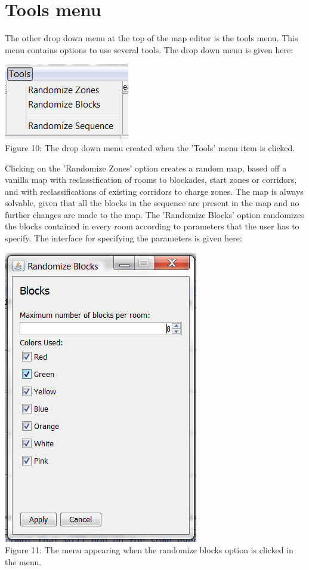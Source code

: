 \documentclass[]{article}
\begin{document}
\section*{Tools menu}
The other drop down menu at the top of the map editor is the tools menu. This menu contains options to use several tools. The drop down menu is given here:
\begin{center}
	\centering
	\includegraphics{DropDownTools.png}\\
	Figure 10: The drop down menu created when the 'Tools' menu item is clicked.
\end{center}
Clicking on the 'Randomize Zones' option creates a random map, based off a vanilla map with reclassification of rooms to blockades, start zones or corridors, and with reclassifications of existing corridors to charge zones. The map is always solvable, given that all the blocks in the sequence are present in the map and no further changes are made to the map. The 'Randomize Blocks' option randomizes the blocks contained in every room according to parameters that the user has to specify. The interface for specifying the parameters is given here:
\begin{center}
	\centering
	\includegraphics[scale=0.6]{MenuBlocks.png}\\
	Figure 11: The menu appearing when the randomize blocks option is clicked in the menu.
\end{center}
\end{document}
